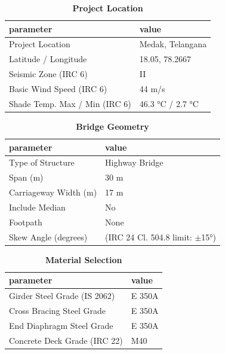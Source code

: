 \documentclass[12pt,a4paper]{report}
\numberwithin{table}{chapter}
\numberwithin{figure}{chapter}
\begin{document}
\begin{table}[H]
\caption{\textbf{Project Location}}
\label{subsec:project-location}
\begin{tabular}{|L{5.5cm}|L{8.5cm}|}
\hline
\textbf{parameter} & \textbf{value} \\
\hline
\textnormal{Project Location} & Medak, Telangana \\
\hline
\textnormal{Latitude / Longitude} & 18.05, 78.2667 \\
\hline
\textnormal{Seismic Zone (IRC 6)} & II \\
\hline
\textnormal{Basic Wind Speed (IRC 6)} & 44 m/s \\
\hline
\textnormal{Shade Temp. Max / Min (IRC 6)} & 46.3 °C / 2.7 °C \\
\hline
\end{tabular}
\vspace{0.4cm}
\end{table}

\begin{table}[H]
\caption{\textbf{Bridge Geometry}}
\label{subsec:bridge-geometry}
\begin{tabular}{|L{5.5cm}|L{8.5cm}|}
\hline
\textbf{parameter} & \textbf{value} \\
\hline
\textnormal{Type of Structure} & Highway Bridge \\
\hline
\textnormal{Span (m)} & 30 m \\
\hline
\textnormal{Carriageway Width (m)} & 17 m \\
\hline
\textnormal{Include Median} & No \\
\hline
\textnormal{Footpath} & None \\
\hline
\textnormal{Skew Angle (degrees)} &  (IRC 24 Cl. 504.8 limit: $\pm$15°) \\
\hline
\end{tabular}
\end{table}
\vspace{0.4cm}

\begin{table}[H]
\caption{\textbf{Material Selection}}
\label{subsec:material}
\begin{tabular}{|L{5.5cm}|L{8.5cm}|}
\hline
\textbf{parameter} & \textbf{value} \\
\hline
\textnormal{Girder Steel Grade (IS 2062)} & E 350A \\
\hline
\textnormal{Cross Bracing Steel Grade} & E 350A \\
\hline
\textnormal{End Diaphragm Steel Grade} & E 350A \\
\hline
\textnormal{Concrete Deck Grade (IRC 22)} & M40 \\
\hline
\end{tabular}
\end{table}
\vspace{0.4cm}
\end{document}
